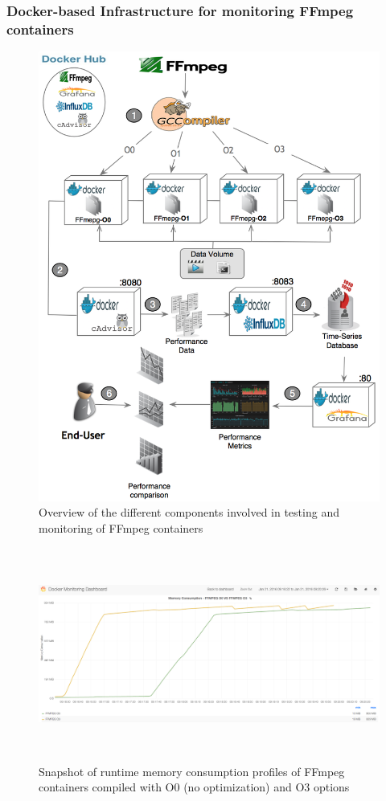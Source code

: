 \subsubsection{Docker-based Infrastructure for monitoring FFmpeg containers}
\begin{figure}[!b]
	\centering
	\includegraphics[width=1.\linewidth]{Ressources/infra_ffmpeg.png}
	\caption{Overview of the different components involved in testing and monitoring of FFmpeg containers}
\end{figure}
\begin{figure}
	
	\center
	
	\includegraphics[width=15cm,height=7cm]{Ressources/infra_stats.png}
	\caption{Snapshot of runtime memory consumption profiles of FFmpeg containers compiled with O0 (no optimization) and O3 options}
	
	\label{AAA}
	
\end{figure}
